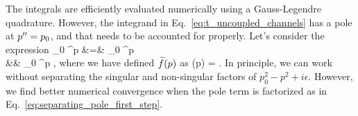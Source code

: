   The integrals are efficiently evaluated numerically using a Gauss-Legendre
  quadrature.  However, the integrand in Eq.~\eqref{eq:t_uncoupled_channels} has
  a pole at $p^{\prime \prime} = p_0$, and that needs to be accounted for properly.
  Let's consider the expression
  \bea
  \label{eq:separating_pole_first_step}
  \int_0 ^\Lambda \dd p 
  &=& \int_0 ^\Lambda \dd p 
  \\ [0.4 em]
  &\equiv& \int_0 ^\Lambda \dd p  \;,
  \label{eq:separating_pole}
  \eea
  where we have defined $\widetilde{f}(p)$ as
  \beq
  (p) =  \;.
  \eeq
  In principle, we can work without separating the singular and non-singular
  factors of $p_0^2 - p^2 + i \epsilon$.  However, we find better numerical
  convergence when the pole term is factorized as in
  Eq.~\eqref{eq:separating_pole_first_step}.

